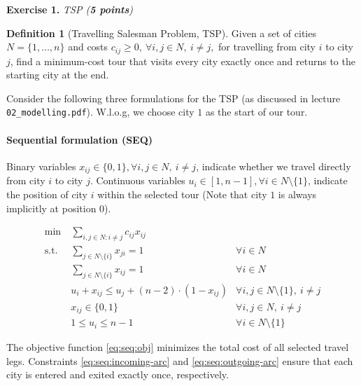 \documentclass[a4paper]{scrartcl}
\newcounter{exc}
\newenvironment{exercise}[1]%
{\refstepcounter{exc}\textbf{Exercise 1.\arabic{exc}} \emph{#1}\\}
{

\hrulefill\medskip}%
\theoremstyle{definition}
\newtheorem{definition}{Definition}
\begin{document}
\begin{exercise}{TSP (\textbf{5 points})}
	\begin{definition}[Travelling Salesman Problem, TSP]
		Given
		a set of cities $N = \{1, \dots, n\}$
		and costs $c_{ij} \geq 0,\ \forall i,j \in N,\ i \neq j,$ for travelling from city $i$ to city $j$,
		find a minimum-cost tour that visits every city exactly once and returns to the starting city at the end.
	\end{definition}
	
	
	Consider the following three formulations for the TSP (as discussed in lecture \texttt{02\_modelling.pdf}).
	W.l.o.g, we choose city $1$ as the start of our tour.
	
	
	\paragraph{Sequential formulation (SEQ)}
	
	Binary variables $x_{ij} \in \{0, 1\}, \forall i,j \in N,\ i \neq j$, indicate whether we travel directly from city $i$ to city $j$.
	Continuous variables $u_i \in [1, n-1], \forall i \in N \setminus \{1\}$, indicate the position of city $i$ within the selected tour (Note that city $1$ is always implicitly at position $0$).
	
	\begin{align}
		\min\ & \sum_{i,j \in N: i \neq j} c_{ij} x_{ij} \label{eq:seq:obj} \\
		\text{s.t.}\ & \sum_{j \in N \setminus \{i\}} x_{ji} = 1 \label{eq:seq:incoming-arc} & \forall i \in N \\
		& \sum_{j \in N \setminus \{i\}} x_{ij} = 1 & \forall i \in N \label{eq:seq:outgoing-arc} \\
		& u_i + x_{ij} \leq u_j + (n-2) \cdot (1 - x_{ij}) & \forall i,j \in N \setminus \{1\},\ i \neq j \label{eq:seq:sequencing} \\
		& x_{ij} \in \{0, 1\} & \forall i,j \in N,\ i \neq j \label{eq:seq:x-domain} \\
		& 1 \leq u_i \leq n - 1 & \forall i \in N \setminus \{1\} \label{eq:seq:u-domain}
	\end{align}
	
	The objective function \eqref{eq:seq:obj} minimizes the total cost of all selected travel legs.
	Constraints \eqref{eq:seq:incoming-arc} and \eqref{eq:seq:outgoing-arc} ensure that each city is entered and exited exactly once, respectively.
	

\end{exercise}
\end{document}
